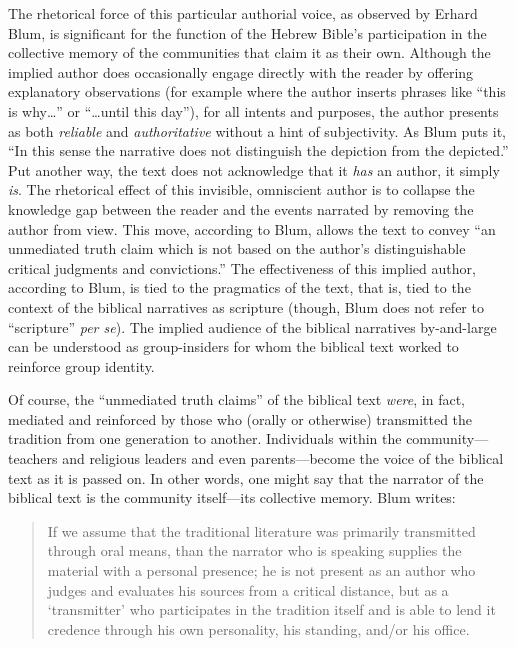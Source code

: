 The rhetorical force of this particular authorial voice, as observed by Erhard Blum, is significant for the function of the Hebrew Bible's participation in the collective memory of the communities that claim it as their own. Although the implied author does occasionally engage directly with the reader by offering explanatory observations (for example where the author inserts phrases like ``this is why\ldots{}'' or ``\ldots{}until this day''), for all intents and purposes, the author presents as both \emph{reliable} and \emph{authoritative} without a hint of subjectivity. As Blum puts it, ``In this sense the narrative does not distinguish the depiction from the depicted.''\autocite[33]{blum_barton-etal2007} Put another way, the text does not acknowledge that it \emph{has} an author, it simply \emph{is}. The rhetorical effect of this invisible, omniscient author is to collapse the knowledge gap between the reader and the events narrated by removing the author from view. This move, according to Blum, allows the text to convey ``an unmediated truth claim which is not based on the author's distinguishable critical judgments and convictions.''\autocite[33]{blum_barton-etal2007} The effectiveness of this implied author, according to Blum, is tied to the pragmatics of the text, that is, tied to the context of the biblical narratives as scripture (though, Blum does not refer to ``scripture'' \emph{per se}). The implied audience of the biblical narratives by-and-large can be understood as group-insiders for whom the biblical text worked to reinforce group identity.

Of course, the ``unmediated truth claims'' of the biblical text \emph{were}, in fact, mediated and reinforced by those who (orally or otherwise) transmitted the tradition from one generation to another.\autocite[33]{blum_barton-etal2007} Individuals within the community---teachers and religious leaders and even parents---become the voice of the biblical text as it is passed on. In other words, one might say that the narrator of the biblical text is the community itself---its collective memory. Blum writes:

\begin{quote}
If we assume that the traditional literature was primarily transmitted through oral means, than the narrator who is speaking supplies the material with a personal presence; he is not present as an author who judges and evaluates his sources from a critical distance, but as a `transmitter' who participates in the tradition itself and is able to lend it credence through his own personality, his standing, and/or his office.\autocite[33]{blum_barton-etal2007}
\end{quote}

